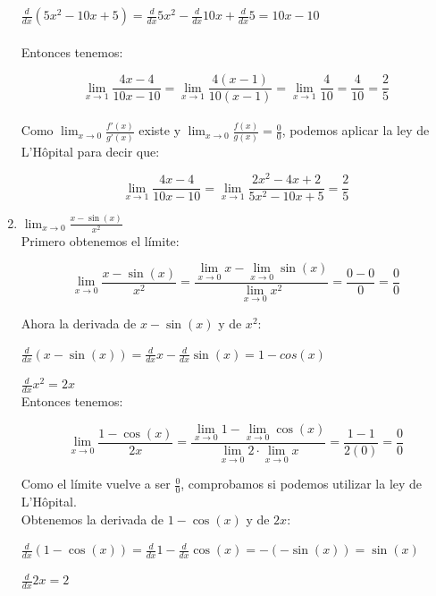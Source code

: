 \documentclass[12pt]{article}
\begin{document}
\begin{enumerate}[\hspace{9px} a)]
        \(\displaystyle\frac{d}{dx}(5x^2-10x+5)=\frac{d}{dx}5x^2-\frac{d}{dx}10x+\frac{d}{dx}5=10x-10\)\\ \\

        Entonces tenemos:

        \[\displaystyle\lim_{x \to 1}\frac{4x-4}{10x-10}=\lim_{x \to 1}\frac{4(x-1)}{10(x-1)} = \lim_{x \to 1}\frac{4}{10} = \frac{4}{10} =\frac{2}{5}\]\\

        Como \(\displaystyle\lim_{x \to 0}\frac{f'(x)}{g'(x)}\) existe y \(\displaystyle\lim_{x \to 0}\frac{f(x)}{g(x)}=\frac{0}{0}\), podemos aplicar la ley de L'H\^opital para decir que:
        
        \[\displaystyle\lim_{x \to 1}\frac{4x-4}{10x-10}=\lim_{x \to 1}\frac{2x^2-4x+2}{5x^2-10x+5}=\frac{2}{5}\]

    \item \(\displaystyle\lim_{x \to 0}\frac{x-\sin(x)}{x^2}\)\\
    
        Primero obtenemos el l\'imite:

        \[\displaystyle\lim_{x \to 0}\frac{x-\sin(x)}{x^2} = \frac{\displaystyle\lim_{x \to 0}x - \lim_{x \to 0}\sin(x)}{\displaystyle\lim_{x \to 0}x^2}=\frac{0-0}{0}=\frac{0}{0}\]

        Ahora la derivada de $x-\sin(x)$ y de $x^2$:

        \(\displaystyle\frac{d}{dx}(x-\sin(x))=\frac{d}{dx}x-\frac{d}{dx}\sin(x)=1-cos(x)\)

        \(\displaystyle\frac{d}{dx}x^2=2x\)\\

        Entonces tenemos:

        \[\displaystyle\lim_{x \to 0}\frac{1-\cos(x)}{2x}=\frac{\displaystyle\lim_{x \to 0}1 - \lim_{x \to 0}\cos(x)}{\lim_{x \to 0}2 \cdot \lim_{x \to 0}x} = \frac{1-1}{2(0)}=\frac{0}{0}\]

        Como el l\'imite vuelve a ser $\displaystyle\frac{0}{0}$, comprobamos si podemos utilizar la ley de L'H\^opital.\\

        Obtenemos la derivada de $1-\cos(x)$ y de $2x$:

        \(\displaystyle\frac{d}{dx}(1-\cos(x)) = \frac{d}{dx}1 - \frac{d}{dx}\cos(x) = -(-\sin(x)) = \sin(x)\)

        \(\displaystyle\frac{d}{dx}2x = 2\)\\


\end{enumerate}
\end{document}
